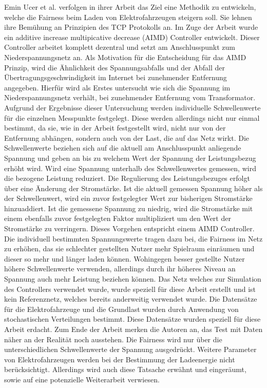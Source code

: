 Emin Ucer et al. verfolgen in ihrer Arbeit \cite{RWTCP} das Ziel eine Methodik zu entwickeln, welche die Fairness beim Laden von Elektrofahrzeugen steigern soll. Sie lehnen ihre Bemühung an Prinzipien des TCP Protokolls an.  Im Zuge der Arbeit wurde ein additive increase multipicative decrease (AIMD) Controller entwickelt. Dieser Controller arbeitet komplett dezentral und setzt am Anschlusspunkt zum Niederspannungsnetz an. Als Motivation für die Entscheidung für das AIMD Prinzip, wird die Ähnlichkeit des Spannungsabfalls und der Abfall der Übertragungsgeschwindigkeit im Internet bei zunehmender Entfernung angegeben. Hierfür wird als Erstes untersucht wie sich die Spannung im Niederspannungsnetz verhält, bei zunehmender Entfernung vom Transformator. Aufgrund der Ergebnisse dieser Untersuchung werden individuelle Schwellenwerte für die einzelnen Messpunkte festgelegt. Diese werden allerdings nicht nur einmal bestimmt, da sie, wie in der Arbeit festgestellt wird, nicht nur von der Entfernung abhängen, sondern auch von der Last, die auf das Netz wirkt. Die Schwellenwerte beziehen sich auf die aktuell am Anschlusspunkt anliegende Spannung und geben an bis zu welchem Wert der Spannung der Leistungsbezug erhöht wird. Wird eine Spannung unterhalb des Schwellenwertes gemessen, wird die bezogene Leistung reduziert. Die Regulierung des Leistungsbezuges erfolgt über eine Änderung der Stromstärke. Ist die aktuell gemessen Spannung höher als der Schwellenwert, wird ein zuvor festgelegter Wert zur bisherigen Stromstärke hinzuaddiert. Ist die gemessene Spannung zu niedrig, wird die Stromstärke mit einem ebenfalls zuvor festgelegten Faktor multipliziert um den Wert der Stromstärke zu verringern. Dieses Vorgehen entspricht einem AIMD Controller. Die individuell bestimmten Spannungswerte tragen dazu bei, die Fairness im Netz zu erhöhen, das sie schlechter gestellten Nutzer mehr Spielraum einräumen und dieser so mehr und länger laden können. Wohingegen besser gestellte Nutzer höhere Schwellenwerte verwenden, allerdings durch ihr höheres Niveau an Spannung auch mehr Leistung beziehen können. Das Netz welches zur Simulation des Controllers verwendet wurde, wurde speziell für diese Arbeit erstellt und ist kein Referenznetz, welches bereits anderweitig verwendet wurde. Die Datensätze für die Elektrofahrzeuge und die Grundlast wurden durch Anwendung von stochastischen Verteilungen bestimmt. Diese Datensätze wurden speziell für diese Arbeit erdacht. Zum Ende der Arbeit merken die Autoren an, das Test mit Daten näher an der Realität noch ausstehen. Die Fairness wird nur über die unterschiedlichen Schwellenwerte der Spannung ausgedrückt. Weitere Parameter von Elektrofahrzeugen werden bei der Bestimmung der Ladeenergie nicht berücksichtigt. Allerdings wird auch diese Tatsache erwähnt und eingeräumt, sowie auf eine potenzielle Weiterarbeit verwiesen. 
